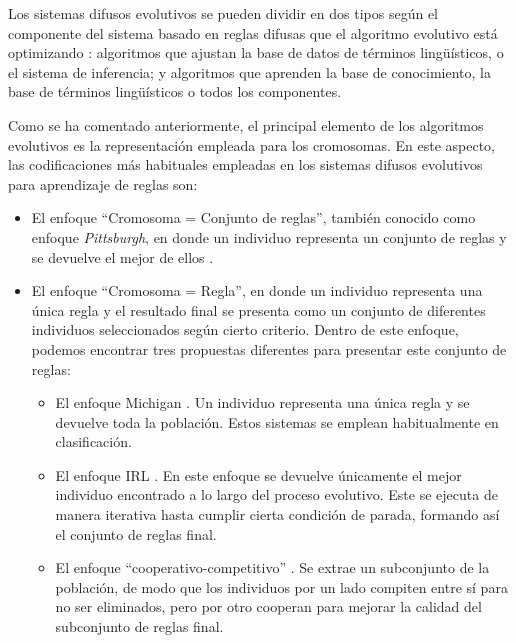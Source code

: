 \documentclass[c5paper,10pt,twoside]{book}	   	%
\begin{document}
Los sistemas difusos evolutivos se pueden dividir en dos tipos según el componente del sistema basado en reglas difusas que el algoritmo evolutivo está optimizando \cite{Her08}: algoritmos que ajustan la base de datos de términos lingüísticos, o el sistema de inferencia; y algoritmos que aprenden la base de conocimiento, la base de términos lingüísticos o todos los componentes.
 
Como se ha comentado anteriormente, el principal elemento de los algoritmos evolutivos es la representación empleada para los cromosomas. En este aspecto, las codificaciones más habituales empleadas en los sistemas difusos evolutivos para aprendizaje de reglas son:

\begin{itemize}
	
	\item El enfoque ``Cromosoma = Conjunto de reglas'', también conocido como enfoque \textit{Pittsburgh}, en donde un individuo representa un conjunto de reglas y se devuelve el mejor de ellos \cite{Smith80}.
	
	\item El enfoque ``Cromosoma = Regla'', en donde un individuo representa una única regla y el resultado final se presenta como un conjunto de diferentes individuos seleccionados según cierto criterio. Dentro de este enfoque, podemos encontrar tres propuestas diferentes para presentar este conjunto de reglas:
	
	\begin{itemize}
		
		\item El enfoque Michigan \cite{Hr78}. Un individuo representa una única regla y se devuelve toda la población. Estos sistemas se emplean habitualmente en clasificación.
		
		\item El enfoque \ac{IRL} \cite{Vent93}. En este enfoque se devuelve únicamente el mejor individuo encontrado a lo largo del proceso evolutivo. Este se ejecuta de manera iterativa hasta cumplir cierta condición de parada, formando así el conjunto de reglas final.
		
		\item El enfoque ``cooperativo-competitivo'' \cite{Gs93}. Se extrae un subconjunto de la población, de modo que los individuos por un lado compiten entre sí para no ser eliminados, pero por otro cooperan para mejorar la calidad del subconjunto de reglas final.
		
	\end{itemize}
\end{itemize}
\end{document}
